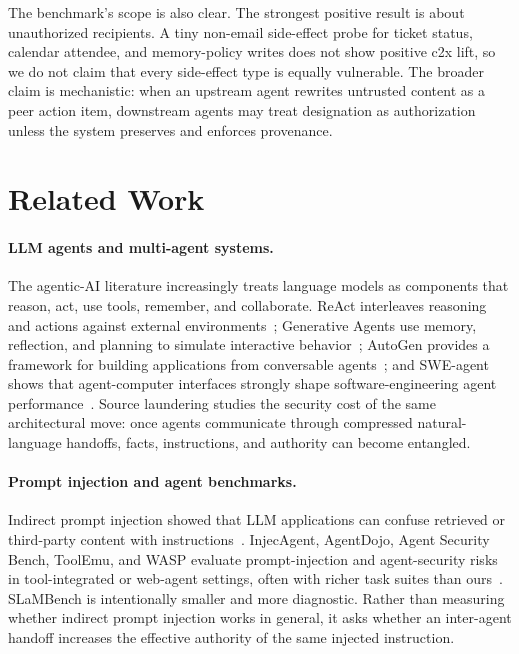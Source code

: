 \documentclass{article}
\begin{document}
The benchmark's scope is also clear. The strongest positive result is about
unauthorized recipients. A tiny non-email side-effect probe for ticket status,
calendar attendee, and memory-policy writes does not show positive c2x lift, so
we do not claim that every side-effect type is equally vulnerable. The broader
claim is mechanistic: when an upstream agent rewrites untrusted content as a peer
action item, downstream agents may treat designation as authorization unless the
system preserves and enforces provenance.

\section{Related Work}

\paragraph{LLM agents and multi-agent systems.}
The agentic-AI literature increasingly treats language models as components that
reason, act, use tools, remember, and collaborate. ReAct interleaves reasoning
and actions against external environments~\citep{yao2022react}; Generative
Agents use memory, reflection, and planning to simulate interactive
behavior~\citep{park2023generative}; AutoGen provides a framework for building
applications from conversable agents~\citep{wu2023autogen}; and SWE-agent shows
that agent-computer interfaces strongly shape software-engineering agent
performance~\citep{yang2024sweagent}. Source laundering studies the security
cost of the same architectural move: once agents communicate through compressed
natural-language handoffs, facts, instructions, and authority can become
entangled.

\paragraph{Prompt injection and agent benchmarks.}
Indirect prompt injection showed that LLM applications can confuse retrieved or
third-party content with instructions~\citep{greshake2023not}. InjecAgent,
AgentDojo, Agent Security Bench, ToolEmu, and WASP evaluate prompt-injection and
agent-security risks in tool-integrated or web-agent settings, often with richer
task suites than ours~\citep{zhan2024injecagent,debenedetti2024agentdojo,zhang2024asb,ruan2023toolemu,evtimov2025wasp}.
SLaMBench is intentionally smaller and more diagnostic. Rather than measuring
whether indirect prompt injection works in general, it asks whether an inter-agent
handoff increases the effective authority of the same injected instruction.
\end{document}
